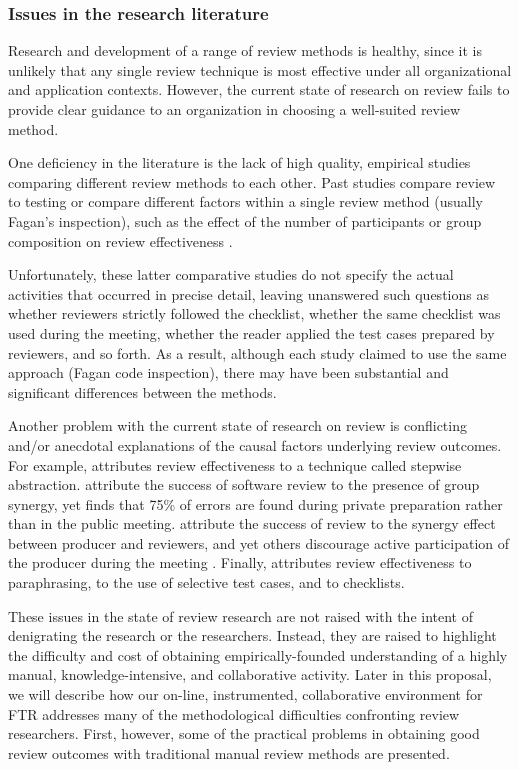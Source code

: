 \subsubsection{Issues in the research literature}

Research and development of a range of review methods is healthy, since it
is unlikely that any single review technique is most effective under all
organizational and application contexts.  However, the current state of
research on review fails to provide clear guidance to an organization in
choosing a well-suited review method.

One deficiency in the literature is the lack of high quality, empirical
studies comparing different review methods to each other.  Past studies
compare review to testing \cite{Myers78,Hetzel76,Basili85} or compare
different factors within a single review method (usually Fagan's
inspection), such as the effect of the number of participants or group
composition on review effectiveness \cite{Bisant89,Martin90}.

Unfortunately, these latter comparative studies do not specify the actual
activities that occurred in precise detail, leaving unanswered such
questions as whether reviewers strictly followed the checklist, whether the
same checklist was used during the meeting, whether the reader applied the
test cases prepared by reviewers, and so forth. As a result, although each
study claimed to use the same approach (Fagan code inspection), there may
have been substantial and significant differences between the methods.

Another problem with the current state of research on review is conflicting
and/or anecdotal explanations of the causal factors underlying review
outcomes.  For example, \cite{Selby85} attributes review effectiveness to a
technique called stepwise abstraction.  \cite{Dunn90,Peele82} attribute the
success of software review to the presence of group synergy, yet
\cite{Humphrey90} finds that 75\% of errors are found during private
preparation rather than in the public meeting.
\cite{Myers78,Parnas85,Peele82} attribute the success of review to the
synergy effect between producer and reviewers, and yet others discourage
active participation of the producer during the meeting
\cite{Ackerman89,Russell91,Pfleeger91}.  Finally, \cite{Fagan76} attributes
review effectiveness to paraphrasing, \cite{Ackerman89} to the use of
selective test cases, and \cite{Knight91} to checklists.

These issues in the state of review research are not raised with the intent
of denigrating the research or the researchers.  Instead, they are raised
to highlight the difficulty and cost of obtaining empirically-founded
understanding of a highly manual, knowledge-intensive, and collaborative
activity.  Later in this proposal, we will describe how our on-line,
instrumented, collaborative environment for FTR addresses many of the
methodological difficulties confronting review researchers.  First,
however, some of the practical problems in obtaining good review outcomes
with traditional manual review methods are presented.


